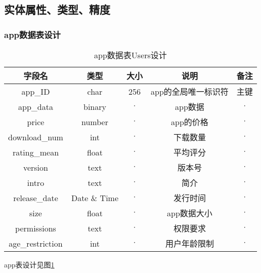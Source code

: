 \subsection{实体属性、类型、精度}
\subsubsection{app数据表设计}
\begin{table}[htbp]
\centering
\caption{app数据表Users设计} \label{tab:app_database}
\begin{tabular}{|c|c|c|c|c|}
    \hline
    字段名 & 类型 & 大小 & 说明 & 备注 \\
    \hline
    app\_ID & char & 256 & app的全局唯一标识符 & 主键 \\
    \hline
    app\_data & binary & $\cdot$ & app数据 & $\cdot$ \\
    \hline
    price & number & $\cdot$ & app的价格 & $\cdot$ \\
    \hline
    download\_num & int & $\cdot$ & 下载数量 & $\cdot$ \\
    \hline 
    rating\_mean & float & $\cdot$ & 平均评分 & $\cdot$ \\
    \hline
    version & text & $\cdot$ & 版本号 & $\cdot$ \\
    \hline
    intro & text & $\cdot$ & 简介 & $\cdot$ \\
    \hline
    release\_date & Date \& Time & $\cdot$ & 发行时间 & $\cdot$ \\
    \hline
    size & float & $\cdot$ & app数据大小 & $\cdot$ \\
    \hline 
    permissions & text & $\cdot$ & 权限要求 & $\cdot$ \\
    \hline
    age\_restriction & int & $\cdot$ & 用户年龄限制 & $\cdot$ \\
    \hline
\end{tabular}
\end{table}

app表设计见图\ref{tab:app_database}

